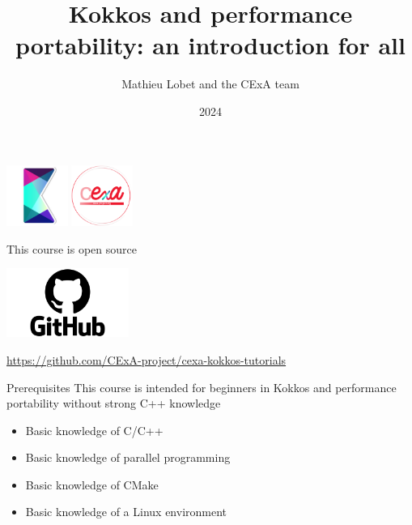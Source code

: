 \documentclass[aspectratio=169]{beamer}
\title{Kokkos and performance portability: an introduction for all}
\author{Mathieu Lobet and the CExA team}
\institute{CEA}
\date{2024}
\begin{document}
\begin{frame}{}
    \titlepage
    \begin{center}
        \includegraphics[width=0.15\textwidth]{kokkos.png}%
        \hspace{2em}%
        \includegraphics[width=0.15\textwidth]{cexa_logo.png}
    \end{center}
\end{frame}


\begin{frame}{This course is open source}
    \begin{center}
        \includegraphics[width=0.3\textwidth]{GitHub-logo.png}

        \href{https://github.com/CExA-project/cexa-kokkos-tutorials}{https://github.com/CExA-project/cexa-kokkos-tutorials}
    \end{center}
\end{frame}


\begin{frame}{Prerequisites}
    This course is intended for beginners in Kokkos and performance portability without strong C++ knowledge

    \begin{itemize}
        \item Basic knowledge of C/C++
        \item Basic knowledge of parallel programming
        \item Basic knowledge of CMake
        \item Basic knowledge of a Linux environment
    \end{itemize}
\end{frame}
\end{document}

